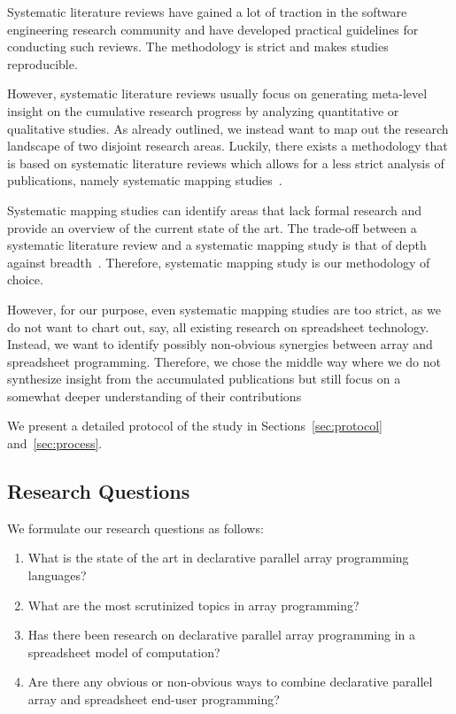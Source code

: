 \documentclass[a4paper]{article}
\begin{document}
Systematic literature reviews have gained a lot of traction in the software engineering research community and \citet{keele2007guidelines} have developed practical guidelines for conducting such reviews. The methodology is strict and makes studies reproducible.

However, systematic literature reviews usually focus on generating meta-level insight on the cumulative research progress by analyzing quantitative or qualitative studies. As already outlined, we instead want to map out the research landscape of two disjoint research areas. Luckily, there exists a methodology that is based on systematic literature reviews which allows for a less strict analysis of publications, namely systematic mapping studies~\cite{petersen2008systematic}.

Systematic mapping studies can identify areas that lack formal research and provide an overview of the current state of the art. The trade-off between a systematic literature review and a systematic mapping study is that of depth against breadth~\cite{keele2007guidelines, petersen2008systematic}. Therefore,
systematic mapping study is our methodology of choice.

However, for our purpose, even systematic mapping studies are too strict, as we do not want to chart out, say, all existing research on spreadsheet technology. Instead, we want to identify possibly non-obvious synergies between array and spreadsheet programming. Therefore, we chose the middle way where we do not synthesize insight from the accumulated publications but still focus on a somewhat deeper understanding of their contributions

We present a detailed protocol of the study in Sections~\ref{sec:protocol} and~\ref{sec:process}.

\subsection{Research Questions}
\label{sec:research-questions}

We formulate our research questions as follows:

\begin{enumerate}
\item What is the state of the art in declarative parallel array programming languages?
\item What are the most scrutinized topics in array programming?
\item Has there been research on declarative parallel array programming in a spreadsheet model of computation?
\item Are there any obvious or non-obvious ways to combine declarative parallel array and spreadsheet end-user programming?
\end{enumerate}
\end{document}
